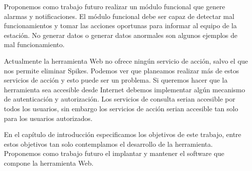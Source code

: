 \begin{description}[style=unboxed,leftmargin=0cm,labelwidth=1cm]
				Proponemos como trabajo futuro realizar un módulo funcional que genere alarmas y notificaciones.  El módulo funcional
				debe ser capaz de detectar mal funcionamientos y tomar las acciones oportunas para informar al equipo de la estación.
				No generar datos o generar datos anormales son algunos ejemplos de mal funcionamiento.
			\item[Autenticación y autorización]
				Actualmente la herramienta Web no ofrece ningún servicio de acción, salvo el que nos permite eliminar Spikes. Podemos
				ver que planeamos realizar más de estos servicios de acción y esto puede ser un problema. Si queremos hacer que la
				herramienta sea accesible desde Internet debemos implementar algún mecanismo de autenticación y autorización. Los
				servicios de consulta serian accesible por todos los usuarios, sin embargo los servicios de acción serian accesible
				tan solo para los usuarios autorizados.
			\item[Implantación y Mantenimiento]
				En el capítulo de introducción especificamos los objetivos de este trabajo, entre estos objetivos tan solo
				contemplamos el desarrollo de la herramienta. Proponemos como trabajo futuro el implantar y mantener el software que
				compone la herramienta Web. 
		\end{description}
